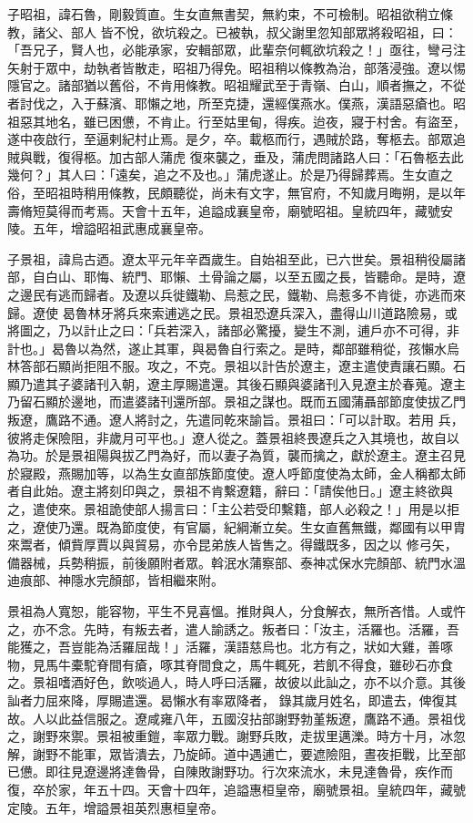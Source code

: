 \begin{pinyinscope}
 子昭祖，諱石魯，剛毅質直。生女直無書契，無約束，不可檢制。昭祖欲稍立條教，諸父、部人
 皆不悅，欲坑殺之。已被執，叔父謝里忽知部眾將殺昭祖，曰：「吾兄子，賢人也，必能承家，安輯部眾，此輩奈何輒欲坑殺之！」亟往，彎弓注矢射于眾中，劫執者皆散走，昭祖乃得免。昭祖稍以條教為治，部落浸強。遼以惕隱官之。諸部猶以舊俗，不肯用條教。昭祖耀武至于青嶺、白山，順者撫之，不從者討伐之，入于蘇濱、耶懶之地，所至克捷，還經僕燕水。僕燕，漢語惡瘡也。昭祖惡其地名，雖已困憊，不肯止。行至姑里甸，得疾。迨夜，寢于村舍。有盜至，遂中夜啟行，至逼剌紀村止焉。是夕，卒。載柩而行，遇賊於路，奪柩去。部眾追賊與戰，復得柩。加古部人蒲虎
 復來襲之，垂及，蒲虎問諸路人曰：「石魯柩去此幾何？」其人曰：「遠矣，追之不及也。」蒲虎遂止。於是乃得歸葬焉。生女直之俗，至昭祖時稍用條教，民頗聽從，尚未有文字，無官府，不知歲月晦朔，是以年壽脩短莫得而考焉。天會十五年，追謚成襄皇帝，廟號昭祖。皇統四年，藏號安陵。五年，增謚昭祖武惠成襄皇帝。



 子景祖，諱烏古迺。遼太平元年辛酉歲生。自始祖至此，已六世矣。景祖稍役屬諸部，自白山、耶悔、統門、耶懶、土骨論之屬，以至五國之長，皆聽命。是時，遼之邊民有逃而歸者。及遼以兵徙鐵勒、烏惹之民，鐵勒、烏惹多不肯徙，亦逃而來歸。遼使
 曷魯林牙將兵來索逋逃之民。景祖恐遼兵深入，盡得山川道路險易，或將圖之，乃以計止之曰：「兵若深入，諸部必驚擾，變生不測，逋戶亦不可得，非計也。」曷魯以為然，遂止其軍，與曷魯自行索之。是時，鄰部雖稍從，孩懶水烏林答部石顯尚拒阻不服。攻之，不克。景祖以計告於遼主，遼主遣使責讓石顯。石顯乃遣其子婆諸刊入朝，遼主厚賜遣還。其後石顯與婆諸刊入見遼主於春蒐。遼主乃留石顯於邊地，而遣婆諸刊還所部。景祖之謀也。既而五國蒲聶部節度使拔乙門叛遼，鷹路不通。遼人將討之，先遣同乾來諭旨。景祖曰：「可以計取。若用
 兵，彼將走保險阻，非歲月可平也。」遼人從之。蓋景祖終畏遼兵之入其境也，故自以為功。於是景祖陽與拔乙門為好，而以妻子為質，襲而擒之，獻於遼主。遼主召見於寢殿，燕賜加等，以為生女直部族節度使。遼人呼節度使為太師，金人稱都太師者自此始。遼主將刻印與之，景祖不肯繫遼籍，辭曰：「請俟他日。」遼主終欲與之，遣使來。景祖詭使部人揚言曰：「主公若受印繫籍，部人必殺之！」用是以拒之，遼使乃還。既為節度使，有官屬，紀綱漸立矣。生女直舊無鐵，鄰國有以甲胄來鬻者，傾貲厚賈以與貿易，亦令昆弟族人皆售之。得鐵既多，因之以
 修弓矢，備器械，兵勢稍振，前後願附者眾。斡泯水蒲察部、泰神忒保水完顏部、統門水溫迪痕部、神隱水完顏部，皆相繼來附。



 景祖為人寬恕，能容物，平生不見喜慍。推財與人，分食解衣，無所吝惜。人或忤之，亦不念。先時，有叛去者，遣人諭誘之。叛者曰：「汝主，活羅也。活羅，吾能獲之，吾豈能為活羅屈哉！」活羅，漢語慈烏也。北方有之，狀如大雞，善啄物，見馬牛橐駝脊間有瘡，啄其脊間食之，馬牛輒死，若飢不得食，雖砂石亦食之。景祖嗜酒好色，飲啖過人，時人呼曰活羅，故彼以此訕之，亦不以介意。其後訕者力屈來降，厚賜遣還。曷懶水有率眾降者，
 錄其歲月姓名，即遣去，俾復其故。人以此益信服之。遼咸雍八年，五國沒拈部謝野勃堇叛遼，鷹路不通。景祖伐之，謝野來禦。景祖被重鎧，率眾力戰。謝野兵敗，走拔里邁濼。時方十月，冰忽解，謝野不能軍，眾皆潰去，乃旋師。道中遇逋亡，要遮險阻，晝夜拒戰，比至部已憊。即往見遼邊將達魯骨，自陳敗謝野功。行次來流水，未見達魯骨，疾作而復，卒於家，年五十四。天會十四年，追謚惠桓皇帝，廟號景祖。皇統四年，藏號定陵。五年，增謚景祖英烈惠桓皇帝。




\end{pinyinscope}
